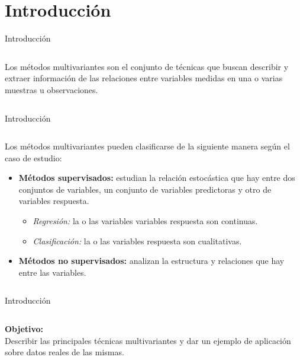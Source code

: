 \section{Introducción}
\begin{frame}{Introducción}
\begin{columns}
\begin{column}{0.9\textwidth}
\begin{defi}
Los métodos multivariantes son el conjunto de técnicas que buscan describir y extraer información de las relaciones entre variables medidas en una o varias muestras u observaciones. 
\end{defi}
\end{column}
\end{columns}

\end{frame}

\begin{frame}{Introducción}
\begin{columns}
\begin{column}{0.9\textwidth}
Los métodos multivariantes pueden clasificarse de la siguiente manera según el caso de estudio:\pause
\begin{itemize}
\item \textbf{Métodos supervisados:} estudian la relación estocástica que hay entre dos conjuntos de variables, un conjunto de variables predictoras y otro de variables respuesta. \pause
\begin{itemize}
\item \textit{Regresión:} la o las  variables variables respuesta son continuas. \pause
\item \textit{Clasificación: }la o las variables respuesta son cualitativas. \pause
\end{itemize}
\item \textbf{Métodos no supervisados: }analizan la estructura y relaciones que hay entre las variables. \pause
\end{itemize}
\end{column}
\end{columns}
\end{frame}

\begin{frame}{Introducción}
\begin{columns}
\begin{column}{0.9\textwidth}
\textbf{Objetivo: }\\
Describir las principales técnicas multivariantes y dar un ejemplo de aplicación sobre datos reales de las mismas.
\end{column}
\end{columns}
\end{frame}
